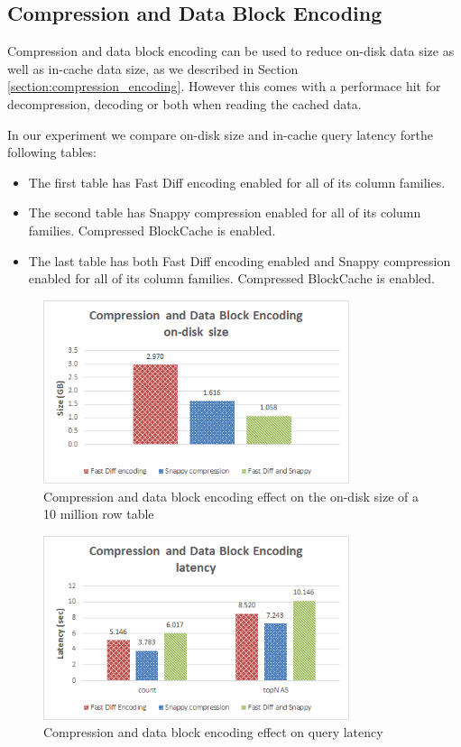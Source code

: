 \subsection{Compression and Data Block Encoding}\label{subsection:benchmarks_compression_encoding}

Compression and data block encoding can be used to reduce on-disk data size as well as in-cache data size, as we described in Section \ref{section:compression_encoding}. However this comes with a performace hit for decompression, decoding or both when reading the cached data.

In our experiment we compare on-disk size and in-cache query latency forthe following tables:
\begin{itemize}
\item The first table has Fast Diff encoding enabled for all of its column families.
\item The second table has Snappy compression enabled for all of its column families. Compressed BlockCache is enabled.
\item The last table has both Fast Diff encoding enabled and Snappy compression enabled for all of its column families. Compressed BlockCache is enabled.
\end{itemize}

\begin{figure}[H]
\centering
\includegraphics[width=0.8\textwidth]{figures/benchmarks_hbase_compression_encoding_size}
\caption{Compression and data block encoding effect on the on-disk size of a 10 million row table}
\label{figure:benchmarks_hbase_compression_encoding_size}
\end{figure}

\begin{figure}[H]
\centering
\includegraphics[width=0.8\textwidth]{figures/benchmarks_hbase_compression_encoding_latency}
\caption{Compression and data block encoding effect on query latency}
\label{figure:benchmarks_hbase_compression_encoding_latency}
\end{figure}

